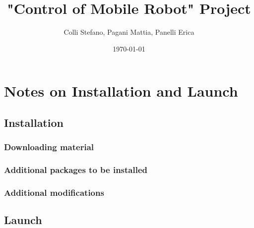 \documentclass[12pt, letterpaper, oneside]{report}
\title{"Control of Mobile Robot" Project}
\author{Colli Stefano, Pagani Mattia, Panelli Erica}
\date{\today}
\begin{document}
	
\maketitle

\begin{abstract}
\end{abstract}

\tableofcontents

\newpage

%

\chapter{Notes on Installation and Launch}

\section{Installation}

\subsection{Downloading material}

\subsection{Additional packages to be installed}

\subsection{Additional modifications}

\section{Launch}
\end{document}
